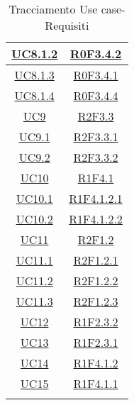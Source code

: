 \begin{longtable}{|c|c|}
\hline
\hyperlink{UC8.1.2}{UC8.1.2} & \hyperlink{R0F3.4.2}{R0F3.4.2}\\
\hline
\hyperlink{UC8.1.3}{UC8.1.3} & \hyperlink{R0F3.4.1}{R0F3.4.1}\\
\hline
\hyperlink{UC8.1.4}{UC8.1.4} & \hyperlink{R0F3.4.4}{R0F3.4.4}\\
\hline
\hyperlink{UC9}{UC9} & \hyperlink{R2F3.3}{R2F3.3}\\
\hline
\hyperlink{UC9.1}{UC9.1} & \hyperlink{R2F3.3.1}{R2F3.3.1}\\
\hline
\hyperlink{UC9.2}{UC9.2} & \hyperlink{R2F3.3.2}{R2F3.3.2}\\
\hline
\hyperlink{UC10}{UC10} & \hyperlink{R1F4.1}{R1F4.1}\\
\hline
\hyperlink{UC10.1}{UC10.1} & \hyperlink{R1F4.1.2.1}{R1F4.1.2.1}\\
\hline
\hyperlink{UC10.2}{UC10.2} & \hyperlink{R1F4.1.2.2}{R1F4.1.2.2}\\
\hline
\hyperlink{UC11}{UC11} & \hyperlink{R2F1.2}{R2F1.2}\\
\hline
\hyperlink{UC11.1}{UC11.1} & \hyperlink{R2F1.2.1}{R2F1.2.1}\\
\hline
\hyperlink{UC11.2}{UC11.2} & \hyperlink{R2F1.2.2}{R2F1.2.2}\\
\hline
\hyperlink{UC11.3}{UC11.3} & \hyperlink{R2F1.2.3}{R2F1.2.3}\\
\hline
\hyperlink{UC12}{UC12} & \hyperlink{R1F2.3.2}{R1F2.3.2}\\
\hline
\hyperlink{UC13}{UC13} & \hyperlink{R1F2.3.1}{R1F2.3.1}\\
\hline
\hyperlink{UC14}{UC14} & \hyperlink{R1F4.1.2}{R1F4.1.2}\\
\hline
\hyperlink{UC15}{UC15} & \hyperlink{R1F4.1.1}{R1F4.1.1}\\
\hline
\caption[Tracciamento Use case-Requisiti]{Tracciamento Use case-Requisiti}
\label{tabella:requi-usecase}
\end{longtable}
\clearpage
